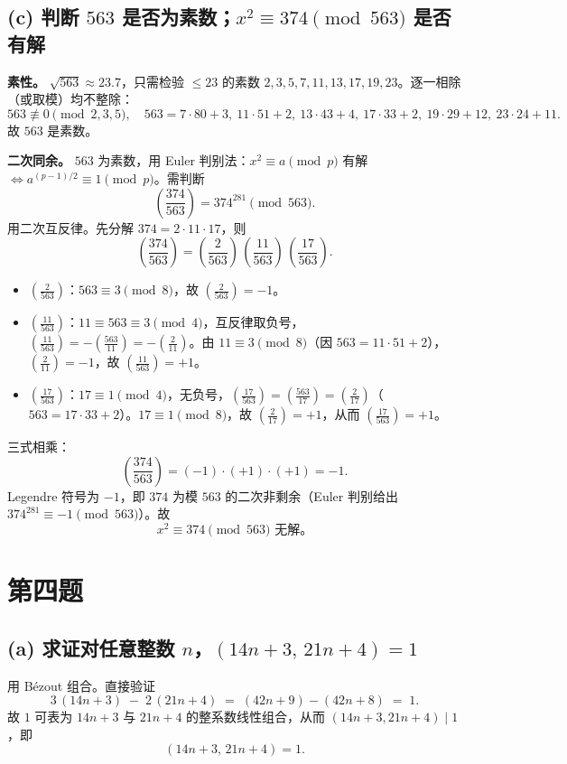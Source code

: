 \documentclass{article}
\newcommand{\leg}[2]{\left(\frac{#1}{#2}\right)}
\begin{document}
\subsection*{(c) 判断 $563$ 是否为素数；$x^{2}\equiv 374\pmod{563}$ 是否有解}

\begin{solution}
\textbf{素性。} $\sqrt{563}\approx 23.7$，只需检验 $\le 23$ 的素数 $2,3,5,7,11,13,17,19,23$。逐一相除（或取模）均不整除：
\[
  563\not\equiv 0\pmod{2,3,5},\quad
  563=7\cdot80+3,\ 11\cdot51+2,\ 13\cdot43+4,\ 17\cdot33+2,\ 19\cdot29+12,\ 23\cdot24+11.
\]
故 $\boxed{563\text{ 是素数。}}$

\textbf{二次同余。} $563$ 为素数，用 Euler 判别法：$x^{2}\equiv a\pmod p$ 有解 $\iff a^{(p-1)/2}\equiv 1\pmod p$。需判断
\[
  \leg{374}{563}=374^{281}\pmod{563}.
\]
用二次互反律。先分解 $374=2\cdot 11\cdot 17$，则
\[
  \leg{374}{563}=\leg{2}{563}\,\leg{11}{563}\,\leg{17}{563}.
\]
\begin{itemize}
  \item $\leg{2}{563}$：$563\equiv 3\pmod 8$，故 $\leg{2}{563}=-1$。
  \item $\leg{11}{563}$：$11\equiv 563\equiv 3\pmod 4$，互反律取负号，
    $\leg{11}{563}=-\leg{563}{11}=-\leg{2}{11}$。由 $11\equiv 3\pmod 8$（因 $563=11\cdot51+2$），$\leg{2}{11}=-1$，故 $\leg{11}{563}=+1$。
  \item $\leg{17}{563}$：$17\equiv 1\pmod 4$，无负号，$\leg{17}{563}=\leg{563}{17}=\leg{2}{17}$（$563=17\cdot33+2$）。$17\equiv 1\pmod 8$，故 $\leg{2}{17}=+1$，从而 $\leg{17}{563}=+1$。
\end{itemize}
三式相乘：
\[
  \leg{374}{563}=(-1)\cdot(+1)\cdot(+1)=-1.
\]
Legendre 符号为 $-1$，即 $374$ 为模 $563$ 的二次非剩余（Euler 判别给出 $374^{281}\equiv -1\pmod{563}$）。故
\[
  \boxed{x^{2}\equiv 374\pmod{563}\text{ 无解。}}
\]
\end{solution}

\section{第四题}

\subsection*{(a) 求证对任意整数 $n$，$(14n+3,\,21n+4)=1$}

\begin{solution}
用 Bézout 组合。直接验证
\[
  3\,(14n+3)\;-\;2\,(21n+4)\;=\;(42n+9)-(42n+8)\;=\;1.
\]
故 $1$ 可表为 $14n+3$ 与 $21n+4$ 的整系数线性组合，从而 $(14n+3,21n+4)\mid 1$，即
\[
  \boxed{(14n+3,\,21n+4)=1.}
\]
\end{solution}
\end{document}

